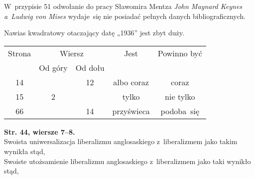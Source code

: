 \documentclass[a4paper,11pt]{article}
\numberwithin{equation}{section}
\begin{document}
\VerSpaceFour





\noindent
{} W~przypisie 51 odwołanie do pracy Sławomira Mentza \textit{John
  Maynard Keynes a~Ludwig von Mises} wydaje~się nie posiadać pełnych danych
bibliograficznych.

\VerSpaceFour





\noindent
{} Nawias kwadratowy otaczający datę „1936” jest zbyt duży.

\VerSpaceFour










\newpage



\begin{center}

  \begin{tabular}{|c|c|c|c|c|}
    \hline
    Strona & \multicolumn{2}{c|}{Wiersz} & Jest
                              & Powinno być \\ \cline{2-3}
    & Od góry & Od dołu & & \\
    \hline
    14  & & 12 & albo coraz & coraz \\
    15  &  2 & & tylko & nie tylko \\
    66  & & 14 & przyświeca & podoba~się \\
    \hline
  \end{tabular}

\end{center}

\VerSpaceTwo


\noindent
\textbf{Str. 44, wiersze 7--8.} \\
\Jest Swoista uniwersalizacja liberalizmu anglosaskiego z~liberalizmem
jako takim wynikła stąd, \\
\PowinnoByc Swoiste utożsamienie liberalizmu anglosaskiego z~liberalizmem
jako taki wynikło stąd, \\
\end{document}
